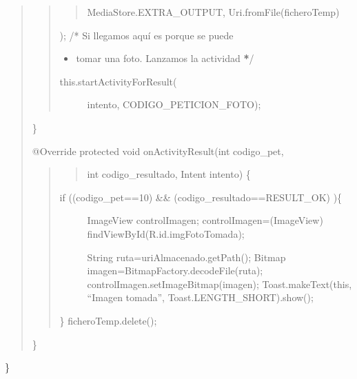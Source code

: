 \documentclass[a4paper,12pt,spanish]{sphinxmanual}
\begin{document}
\begin{description}
\begin{quote}
\begin{quote}
\begin{quote}
MediaStore.EXTRA\_OUTPUT,
Uri.fromFile(ficheroTemp)
\end{quote}

);
/* Si llegamos aquí es porque se puede
\begin{itemize}
\item {} 
tomar una foto. Lanzamos la actividad {\color{red}\bfseries{}*}/

\end{itemize}
\begin{description}
\item[{this.startActivityForResult(}] \leavevmode
intento, CODIGO\_PETICION\_FOTO);

\end{description}
\end{quote}

\}

@Override
protected void onActivityResult(int codigo\_pet,
\begin{quote}
\begin{quote}

int codigo\_resultado, Intent intento) \{
\end{quote}
\begin{description}
\item[{if ((codigo\_pet==10) \&\& (codigo\_resultado==RESULT\_OK) )\{}] \leavevmode
ImageView controlImagen;
controlImagen=(ImageView) findViewById(R.id.imgFotoTomada);

String ruta=uriAlmacenado.getPath();
Bitmap imagen=BitmapFactory.decodeFile(ruta);
controlImagen.setImageBitmap(imagen);
Toast.makeText(this, ``Imagen tomada'', Toast.LENGTH\_SHORT).show();

\end{description}

\}
ficheroTemp.delete();
\end{quote}

\}
\end{quote}

\}

\end{description}
\end{document}
